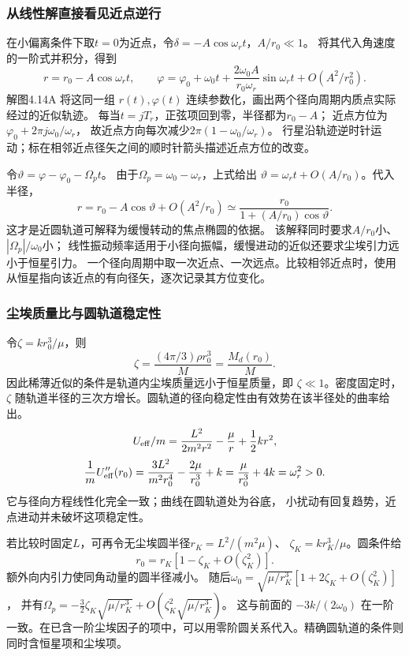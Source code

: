 \documentclass[UTF8,fontset=fandol,a4paper,11pt]{ctexart}
\begin{document}
\subsubsection*{从线性解直接看见近点逆行}
在小偏离条件下取$t=0$为近点，令$\delta=-A\cos\omega_rt$，$A/r_0\ll1$。
将其代入角速度的一阶式并积分，得到
\[
r=r_0-A\cos\omega_rt,\qquad
\varphi=\varphi_0+\omega_0t+
\frac{2\omega_0A}{r_0\omega_r}\sin\omega_rt
+O(A^2/r_0^2).
\]
解图4.14A 将这同一组 $r(t),\varphi(t)$ 连续参数化，画出两个径向周期内质点实际经过的近似轨迹。
每当$t=jT_r$，正弦项回到零，半径都为$r_0-A$；
近点方位为$\varphi_0+2\pi j\omega_0/\omega_r$，
故近点方向每次减少$2\pi(1-\omega_0/\omega_r)$。
行星沿轨迹逆时针运动；标在相邻近点径矢之间的顺时针箭头描述近点方位的改变。

令$\vartheta=\varphi-\varphi_0-\Omega_pt$。
由于$\Omega_p=\omega_0-\omega_r$，上式给出
$\vartheta=\omega_rt+O(A/r_0)$。代入半径，
\[
r=r_0-A\cos\vartheta+O(A^2/r_0)
\simeq\frac{r_0}{1+(A/r_0)\cos\vartheta}.
\]
这才是近圆轨道可解释为缓慢转动的焦点椭圆的依据。
该解释同时要求$A/r_0$小、$|\Omega_p|/\omega_0$小；
线性振动频率适用于小径向振幅，缓慢进动的近似还要求尘埃引力远小于恒星引力。
一个径向周期中取一次近点、一次远点。比较相邻近点时，使用从恒星指向该近点的有向径矢，逐次记录其方位变化。

\subsubsection*{尘埃质量比与圆轨道稳定性}
令$\zeta=k r_0^3/\mu$，则
\[
\zeta=\frac{(4\pi/3)\rho r_0^3}{M}
=\frac{M_d(r_0)}M.
\]
因此稀薄近似的条件是轨道内尘埃质量远小于恒星质量，即 $\zeta\ll1$。密度固定时，$\zeta$ 随轨道半径的三次方增长。圆轨道的径向稳定性由有效势在该半径处的曲率给出。
\[
U_{\rm eff}/m=\frac{L^2}{2m^2r^2}-\frac{\mu}r+\frac12kr^2,
\]
\[
\frac1mU_{\rm eff}''(r_0)
=\frac{3L^2}{m^2r_0^4}-\frac{2\mu}{r_0^3}+k
=\frac\mu{r_0^3}+4k=\omega_r^2>0.
\]
它与径向方程线性化完全一致；曲线在圆轨道处为谷底，
小扰动有回复趋势，近点进动并未破坏这项稳定性。

若比较时固定$L$，可再令无尘埃圆半径$r_K=L^2/(m^2\mu)$、
$\zeta_K=kr_K^3/\mu$。圆条件给
\[
r_0=r_K[1-\zeta_K+O(\zeta_K^2)].
\]
额外向内引力使同角动量的圆半径减小。
随后$\omega_0=\sqrt{\mu/r_K^3}[1+2\zeta_K+O(\zeta_K^2)]$，
并有$\Omega_p=-\tfrac32\zeta_K\sqrt{\mu/r_K^3}+O(\zeta_K^2\sqrt{\mu/r_K^3})$。
这与前面的 $-3k/(2\omega_0)$ 在一阶一致。在已含一阶尘埃因子的项中，可以用零阶圆关系代入。精确圆轨道的条件则同时含恒星项和尘埃项。


\end{document}
